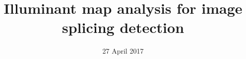 \documentclass{beamer}
\author{}
\title{\huge Illuminant map analysis for image splicing detection}
\date{27 April 2017}
\begin{document}
\titlepageframe



\end{document}
